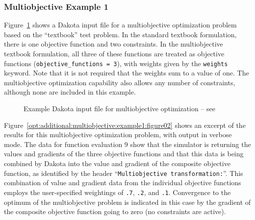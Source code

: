 \subsubsection{Multiobjective Example 1}
\label{opt:additional:multiobjective:example1}

Figure~\ref{opt:additional:multiobjective:example1:figure01} shows a
Dakota input file for a multiobjective optimization problem based on
the ``textbook'' test problem.  In the standard textbook formulation,
there is one objective function and two constraints. In the
multiobjective textbook formulation, all three of these functions are
treated as objective functions (\texttt{objective\_functions = 3}),
with weights given by the \texttt{weights} keyword. Note that it is
not required that the weights sum to a value of one. The
multiobjective optimization capability also allows any number of
constraints, although none are included in this example.

\begin{figure}
\centering
\begin{bigbox}
\begin{small}
\end{small}
\end{bigbox}
\caption{Example Dakota input file for multiobjective optimization --
see \protect{} }
\label{opt:additional:multiobjective:example1:figure01}
\end{figure}

Figure~\ref{opt:additional:multiobjective:example1:figure02} shows an
excerpt of the results for this multiobjective optimization problem,
with output in verbose mode. The data for function evaluation 9 show
that the simulator is returning the values and gradients of the three
objective functions and that this data is being combined by Dakota
into the value and gradient of the composite objective function, as
identified by the header ``\texttt{Multiobjective
  transformation:}''. This combination of value and gradient data from
the individual objective functions employs the user-specified
weightings of \texttt{.7}, \texttt{.2}, and \texttt{.1}. Convergence
to the optimum of the multiobjective problem is indicated in this case
by the gradient of the composite objective function going to zero (no
constraints are active).

